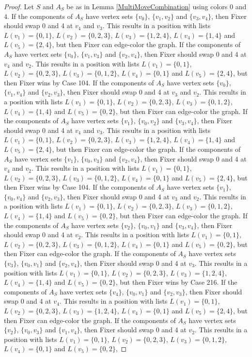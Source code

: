 \documentclass[12pt]{amsart}
\theoremstyle{plain}
\theoremstyle{definition}
\theoremstyle{remark}
\begin{document}
\begin{proof}
Let $S$ and $A_S$ be as in Lemma \ref{MultiMoveCombination} using colors $0$ and $4$. If the components of $A_S$ have vertex sets $\{v_0\}$, $\{v_1, v_2\}$ and $\{v_3, v_4\}$, then Fixer should swap 0 and 4 at $v_4$ and $v_3$. This results in a position with lists $L(v_1) = \{0, 1\}$, $L(v_2) = \{0, 2, 3\}$, $L(v_3) = \{1, 2, 4\}$, $L(v_4) = \{1, 4\}$ and $L(v_5) = \{2, 4\}$, but then Fixer can edge-color the graph. If the components of $A_S$ have vertex sets $\{v_0\}$, $\{v_1, v_3\}$ and $\{v_2, v_4\}$, then Fixer should swap 0 and 4 at $v_4$ and $v_2$. This results in a position with lists $L(v_1) = \{0, 1\}$, $L(v_2) = \{0, 2, 3\}$, $L(v_3) = \{0, 1, 2\}$, $L(v_4) = \{0, 1\}$ and $L(v_5) = \{2, 4\}$, but then Fixer wins by Case 104. If the components of $A_S$ have vertex sets $\{v_0\}$, $\{v_1, v_4\}$ and $\{v_2, v_3\}$, then Fixer should swap 0 and 4 at $v_3$ and $v_2$. This results in a position with lists $L(v_1) = \{0, 1\}$, $L(v_2) = \{0, 2, 3\}$, $L(v_3) = \{0, 1, 2\}$, $L(v_4) = \{1, 4\}$ and $L(v_5) = \{0, 2\}$, but then Fixer can edge-color the graph. If the components of $A_S$ have vertex sets $\{v_1\}$, $\{v_0, v_2\}$ and $\{v_3, v_4\}$, then Fixer should swap 0 and 4 at $v_4$ and $v_3$. This results in a position with lists $L(v_1) = \{0, 1\}$, $L(v_2) = \{0, 2, 3\}$, $L(v_3) = \{1, 2, 4\}$, $L(v_4) = \{1, 4\}$ and $L(v_5) = \{2, 4\}$, but then Fixer can edge-color the graph. If the components of $A_S$ have vertex sets $\{v_1\}$, $\{v_0, v_3\}$ and $\{v_2, v_4\}$, then Fixer should swap 0 and 4 at $v_4$ and $v_2$. This results in a position with lists $L(v_1) = \{0, 1\}$, $L(v_2) = \{0, 2, 3\}$, $L(v_3) = \{0, 1, 2\}$, $L(v_4) = \{0, 1\}$ and $L(v_5) = \{2, 4\}$, but then Fixer wins by Case 104. If the components of $A_S$ have vertex sets $\{v_1\}$, $\{v_0, v_4\}$ and $\{v_2, v_3\}$, then Fixer should swap 0 and 4 at $v_3$ and $v_2$. This results in a position with lists $L(v_1) = \{0, 1\}$, $L(v_2) = \{0, 2, 3\}$, $L(v_3) = \{0, 1, 2\}$, $L(v_4) = \{1, 4\}$ and $L(v_5) = \{0, 2\}$, but then Fixer can edge-color the graph. If the components of $A_S$ have vertex sets $\{v_2\}$, $\{v_0, v_1\}$ and $\{v_3, v_4\}$, then Fixer should swap 0 and 4 at $v_2$. This results in a position with lists $L(v_1) = \{0, 1\}$, $L(v_2) = \{0, 2, 3\}$, $L(v_3) = \{0, 1, 2\}$, $L(v_4) = \{0, 1\}$ and $L(v_5) = \{0, 2\}$, but then Fixer can edge-color the graph. If the components of $A_S$ have vertex sets $\{v_3\}$, $\{v_0, v_1\}$ and $\{v_2, v_4\}$, then Fixer should swap 0 and 4 at $v_3$. This results in a position with lists $L(v_1) = \{0, 1\}$, $L(v_2) = \{0, 2, 3\}$, $L(v_3) = \{1, 2, 4\}$, $L(v_4) = \{1, 4\}$ and $L(v_5) = \{0, 2\}$, but then Fixer wins by Case 216. If the components of $A_S$ have vertex sets $\{v_4\}$, $\{v_0, v_1\}$ and $\{v_2, v_3\}$, then Fixer should swap 0 and 4 at $v_4$. This results in a position with lists $L(v_1) = \{0, 1\}$, $L(v_2) = \{0, 2, 3\}$, $L(v_3) = \{1, 2, 4\}$, $L(v_4) = \{0, 1\}$ and $L(v_5) = \{2, 4\}$, but then Fixer can edge-color the graph. If the components of $A_S$ have vertex sets $\{v_2\}$, $\{v_0, v_3\}$ and $\{v_1, v_4\}$, then Fixer should swap 0 and 4 at $v_2$. This results in a position with lists $L(v_1) = \{0, 1\}$, $L(v_2) = \{0, 2, 3\}$, $L(v_3) = \{0, 1, 2\}$, $L(v_4) = \{0, 1\}$ and $L(v_5) = \{0, 2\}$, 
\end{proof}
\end{document}

